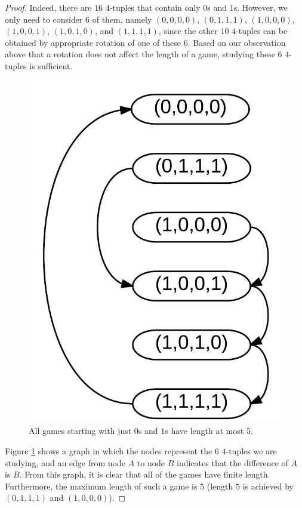 \documentclass[12pt]{amsart}
\begin{document}
\begin{proof}
Indeed, there are $16$ $4$-tuples that contain only $0$s and $1$s. However, we only need to consider $6$ of them, namely $(0,0,0,0)$, $(0,1,1,1)$, $(1,0,0,0)$, $(1,0,0,1)$, $(1,0,1,0)$, and $(1,1,1,1)$, since the other $10$ $4$-tuples can be obtained by appropriate rotation of one of these $6$. Based on our observation above that a rotation does not affect the length of a game, studying these $6$ $4$-tuples is sufficient.

\begin{figure}
\includegraphics{number_squares_0s_and_1s.png}
\caption{All games starting with just $0$s and $1$s have length at most $5$.}
\label{fig:zerosones}
\end{figure}

Figure \ref{fig:zerosones} shows a graph in which the nodes represent the $6$ $4$-tuples we are studying, and an edge from node $A$ to node $B$ indicates that the difference of $A$ is $B$. From this graph, it is clear that all of the games have finite length. Furthermore, the maximum length of such a game is $5$ (length $5$ is achieved by $(0,1,1,1)$ and $(1,0,0,0)$).

\end{proof}
\end{document}
